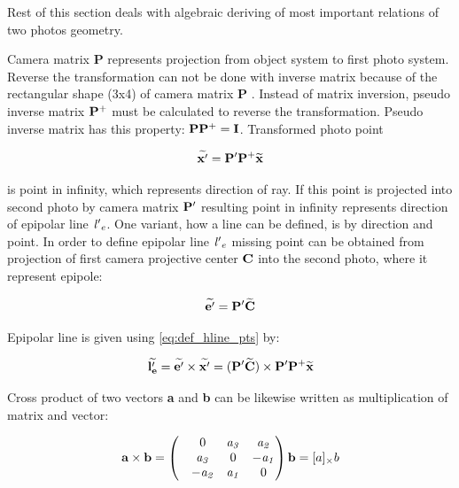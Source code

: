 \documentclass[a4paper,12pt]{article}
\newcommand{\ematr}[1]{
{\bf #1}
}
\newcommand{\evect}[1]{
{\bf #1}
}
\newcommand{\ehvect}[1]{
{\bf \widetilde{#1}}
}
\newcommand{\escal}[1]{
{\it #1}
}
\begin{document}
Rest of this section deals with algebraic deriving of most important relations of two photos geometry. 

Camera matrix \ematr{P} represents projection from object system to first photo system.
Reverse the transformation can not be done with inverse matrix because of the rectangular shape (3x4) of 
camera matrix \ematr{P}. Instead of matrix inversion,  pseudo inverse matrix $\ematr{P}^{+}$ must be 
calculated to reverse the transformation. Pseudo inverse matrix has this property: $\ematr{P}\ematr{P}^{+} = \ematr{I}$.
Transformed photo point

\begin{equation}
\ehvect{x'} =  \ematr{P'}\ematr{P}^{+}\ehvect{x}
\end{equation}

is point in infinity, which represents direction of ray.
If this point is projected into second photo by camera matrix $\ematr{P'}$ resulting point in infinity 
represents direction of epipolar line $\escal{l'}_{e}$. One variant, how a line can be defined, is by direction 
and point. In order to define epipolar line $\escal{l'}_{e}$ missing point can be obtained from 
projection of first camera projective center $\evect{C}$ into the second photo, where it represent
epipole:

\begin{equation}
\ehvect{e'} =  \ematr{P'}\ehvect{C} \\
\end{equation}



Epipolar line is given using \eqref{eq:def_hline_pts} by:

\begin{equation}
\ehvect{l'_{e}} =  \ehvect{e'} \times \ehvect{x'} = (\ematr{P'}\ehvect{C}) \times \ematr{P'}\ematr{P}^{+}\ehvect{x}
\end{equation}

Cross product of two vectors \evect{a} and \evect{b} can be likewise written as multiplication of matrix and vector:

\begin{equation}
\evect{a}  \times \evect{b}  = 
\begin{pmatrix}
   & 0      & \escal{a_{3}}   & \escal{a_{2}}\\
   & \escal{a_{3}}  & 0               & \escal{-a_{1}}\\
   & \escal{-a_{2}} & \escal{a_{1}}   & 0\\
\end{pmatrix}
\evect{b} = [a]_{\times} b
\end{equation}
\end{document}
